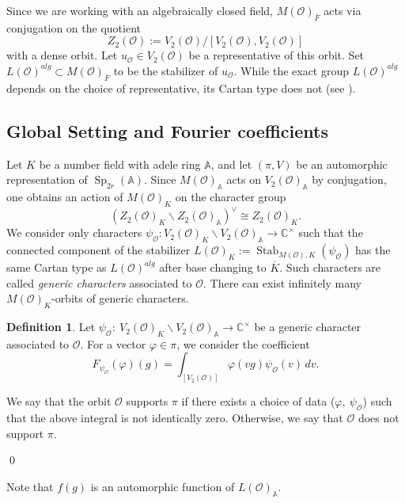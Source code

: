 \documentclass[11pt,reqno]{amsart}
\theoremstyle{definition}
\newtheorem{Def}[Thm]{Definition}
\theoremstyle{remark}
\theoremstyle{definition}
\begin{document}
Since we are working with an algebraically closed field, $M({\mathcal{O}})_{\overline{F}}$ acts via conjugation on the quotient $$Z_2({\mathcal{O}}):=V_2({\mathcal{O}})/[V_2({\mathcal{O}}),V_2({\mathcal{O}})]$$ with a dense orbit. Let $u_{\mathcal{O}}\in V_2({\mathcal{O}})$ be a representative of this orbit. Set $L({\mathcal{O}})^{alg}\subset M({\mathcal{O}})_{\overline{F}}$ to be the stabilizer of $u_{\mathcal{O}}$. While the exact group $L({\mathcal{O}})^{alg}$ depends on the choice of representative, its Cartan type does not (see \cite{CM}).\\
\subsection{Global Setting and Fourier coefficients}
Let $K$ be a number field with adele ring ${\mathbb A}$, and let $(\pi,V)$ be an automorphic representation of $\operatorname{Sp}_{2r}({\mathbb A})$.
Since $M({\mathcal{O}})_{\mathbb A}$ acts on $V_2({\mathcal{O}})_{\mathbb A}$ by conjugation, one obtains an action of $M({\mathcal{O}})_K$ on the character group  $$\left(Z_2({\mathcal{O}})_K\backslash Z_2({\mathcal{O}})_{\mathbb A}\right)^\vee\cong Z_2({\mathcal{O}})_K.$$ 
We consider only characters $\psi_{\mathcal{O}} : V_2({\mathcal{O}})_K\backslash V_2({\mathcal{O}})_{\mathbb A}\to {\mathbb C}^\times$ such that the connected component of the stabilizer $L({\mathcal{O}})_K := \operatorname{Stab}_{M({\mathcal{O}}),K}(\psi_{\mathcal{O}})$ has the same Cartan type as $L({\mathcal{O}})^{alg}$ after base changing to $\overline{K}$. Such characters are called \emph{generic characters} associated to ${\mathcal{O}}$. There can exist infinitely many $M({\mathcal{O}})_K$-orbits of generic characters. 

\begin{Def}
 Let $\psi_{\mathcal{O}}:~V_2({\mathcal{O}})_K\backslash V_2({\mathcal{O}})_{\mathbb A}\to {\mathbb C}^\times$ be a generic character associated to ${\mathcal{O}}$.
For a vector $\varphi\in\pi$, we consider the coefficient
\[
F_{\psi_{\mathcal{O}}}(\varphi)(g)=\displaystyle \int_{[V_2({\mathcal{O}})]}{\varphi}(vg)\psi_{\mathcal{O}}(v)\,dv.
\]

We say that the orbit ${\mathcal{O}}$ supports $\pi$ if there exists a choice of data ($\varphi,\: \psi_{\mathcal{O}}$) such that the above integral is not identically zero. Otherwise, we say that ${\mathcal{O}}$ does not support $\pi$.
\end{Def}\qed

Note that $f(g)$ is an automorphic function of $L({\mathcal{O}})_{\mathbb A}$.
\end{document}
